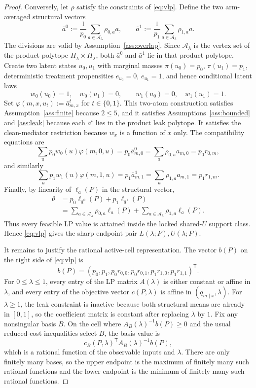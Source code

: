 \begin{proof}
Conversely, let \(\rho\) satisfy the constraints of \eqref{eq:vlp}. Define the two arm-averaged structural
vectors
\[
  \bar a^0:=\frac{1}{p_0}\sum_{a\in\mathcal A_\lambda}\rho_{0,a}a,
  \qquad
  \bar a^1:=\frac{1}{p_1}\sum_{a\in\mathcal A_\lambda}\rho_{1,a}a.
\]
The divisions are valid by Assumption~\ref{ass:overlap}. Since \(\mathcal A_\lambda\) is the vertex set of the
product polytope \(H_{\bar\lambda}\times H_{\bar\lambda}\), both \(\bar a^0\) and \(\bar a^1\) lie in that
product polytope. Create two latent states \(u_0,u_1\) with marginal masses
\(\pi(u_0)=p_0\), \(\pi(u_1)=p_1\), deterministic treatment propensities
\(e_{u_0}=0\), \(e_{u_1}=1\), and hence conditional latent laws
\[
  w_0(u_0)=1,\quad w_0(u_1)=0,\qquad
  w_1(u_0)=0,\quad w_1(u_1)=1.
\]
Set \(\varphi(m,x,u_t):=\bar a^t_{m,x}\) for \(t\in\{0,1\}\). This two-atom construction satisfies
Assumption~\ref{ass:finite} because \(2\le5\), and it satisfies Assumptions~\ref{ass:bounded} and
\ref{ass:leak} because each \(\bar a^t\) lies in the product leak polytope. It satisfies the clean-mediator
restriction because \(w_x\) is a function of \(x\) only. The compatibility equations are
\[
  \sum_u p_0w_0(u)\varphi(m,0,u)
  =p_0\bar a^0_{m,0}
  =\sum_a\rho_{0,a}a_{m,0}
  =p_0r_{0,m},
\]
and similarly
\[
  \sum_u p_1w_1(u)\varphi(m,1,u)
  =p_1\bar a^1_{m,1}
  =\sum_a\rho_{1,a}a_{m,1}
  =p_1r_{1,m}.
\]
Finally, by linearity of \(\ell_a(P)\) in the structural vector,
\[
\begin{aligned}
  \theta
  &=p_0\ell_{\bar a^0}(P)+p_1\ell_{\bar a^1}(P)\\
  &=\sum_{a\in\mathcal A_\lambda}\rho_{0,a}\ell_a(P)
    +\sum_{a\in\mathcal A_\lambda}\rho_{1,a}\ell_a(P).
\end{aligned}
\]
Thus every feasible LP value is attained inside the locked shared-\(U\) support class. Hence \eqref{eq:vlp}
gives the sharp endpoint pair \(L(\lambda;P),U(\lambda;P)\).

It remains to justify the rational active-cell representation. The vector \(b(P)\) on the right side of
\eqref{eq:vlp} is
\[
  b(P)=(p_0,p_1,p_0r_{0,0},p_0r_{0,1},p_1r_{1,0},p_1r_{1,1})^\mathsf{T}.
\]
For \(0\le\lambda\le1\), every entry of the LP matrix \(A(\lambda)\) is either constant or affine in
\(\lambda\), and every entry of the objective vector \(c(P,\lambda)\) is affine in
\((q_{m\mid x},\lambda)\). For \(\lambda\ge1\), the leak constraint is inactive because both structural means
are already in \([0,1]\), so the coefficient matrix is constant after replacing \(\lambda\) by \(1\). Fix any
nonsingular basis \(B\). On the cell where \(A_B(\lambda)^{-1}b(P)\ge0\) and the usual reduced-cost
inequalities select \(B\), the basis value is
\[
  c_B(P,\lambda)^\mathsf{T}A_B(\lambda)^{-1}b(P),
\]
which is a rational function of the observable inputs and \(\lambda\). There are only finitely many bases, so
the upper endpoint is the maximum of finitely many such rational functions and the lower endpoint is the
minimum of finitely many such rational functions.


\end{proof}
